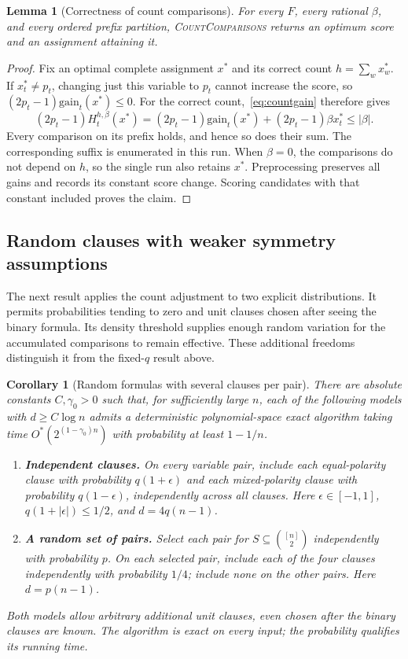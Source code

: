\documentclass[11pt,a4paper]{article}
\newtheorem{lemma}[theorem]{Lemma}
\newtheorem{corollary}[theorem]{Corollary}
\theoremstyle{definition}
\theoremstyle{remark}
\newcommand{\Ostar}{O^{*}}
\begin{document}
\begin{lemma}[Correctness of count comparisons]\label{lem:count_correctness}
For every $F$, every rational $\beta$, and every ordered prefix partition,
\textnormal{\textsc{CountComparisons}} returns an optimum score and an
assignment attaining it.
\end{lemma}
\begin{proof}
Fix an optimal complete assignment $x^*$ and its correct count
$h=\sum_wx_w^*$. If $x_t^*\ne p_t$, changing just this variable to $p_t$
cannot increase the score, so
$(2p_t-1)\mathrm{gain}_t(x^*)\le0$.
For the correct count,~\eqref{eq:countgain} therefore gives
\[
 (2p_t-1)H_t^{h,\beta}(x^*)
 =(2p_t-1)\mathrm{gain}_t(x^*)+(2p_t-1)\beta x_t^*
 \le|\beta|.
\]
Every comparison on its prefix holds, and hence so does their sum.
The corresponding suffix is enumerated in this run.
When $\beta=0$, the comparisons do not depend on $h$, so the single run
also retains $x^*$. Preprocessing preserves all gains and records its
constant score change. Scoring candidates with that constant included
proves the claim.
\end{proof}

\subsection{Random clauses with weaker symmetry assumptions}

The next result applies the count adjustment to two explicit distributions.
It permits probabilities tending to zero and unit clauses chosen after
seeing the binary formula. Its density threshold supplies enough random
variation for the accumulated comparisons to remain effective.
These additional freedoms distinguish it from the fixed-$q$ result above.

\begin{corollary}[Random formulas with several clauses per pair]
\label{thm:randomclauses}
There are absolute constants $C,\gamma_0>0$ such that, for sufficiently
large $n$, each of the following models with $d\ge C\log n$ admits a
deterministic polynomial-space exact algorithm taking time
$\Ostar(2^{(1-\gamma_0)n})$ with probability at least $1-1/n$.
\begin{enumerate}
\item \textbf{Independent clauses.} On every variable pair, include each
equal-polarity clause with probability $q(1+\epsilon)$ and each
mixed-polarity clause with probability $q(1-\epsilon)$, independently across
all clauses. Here $\epsilon\in[-1,1]$,
$q(1+|\epsilon|)\le1/2$, and $d=4q(n-1)$.
\item \textbf{A random set of pairs.} Select each pair for
$S\subseteq\binom{[n]}2$ independently with probability $p$. On each selected
pair, include each of the four clauses independently with probability $1/4$;
include none on the other pairs. Here $d=p(n-1)$.
\end{enumerate}
Both models allow arbitrary additional unit clauses, even chosen after the
binary clauses are known. The algorithm is exact on every input; the
probability qualifies its running time.
\end{corollary}
\end{document}
